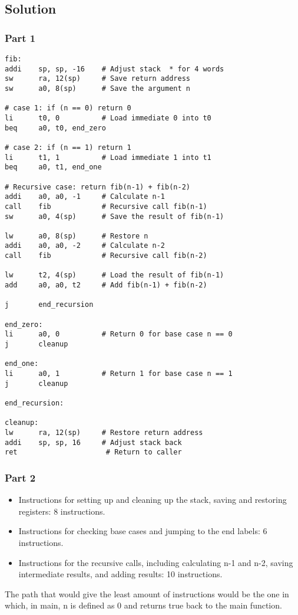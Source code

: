 \documentclass[11pt]{article}
\begin{document}
\subsection*{Solution}
\subsubsection*{Part 1}
\begin{lstlisting}
fib:
addi    sp, sp, -16    # Adjust stack  * for 4 words 
sw      ra, 12(sp)     # Save return address
sw      a0, 8(sp)      # Save the argument n

# case 1: if (n == 0) return 0
li      t0, 0          # Load immediate 0 into t0
beq     a0, t0, end_zero

# case 2: if (n == 1) return 1
li      t1, 1          # Load immediate 1 into t1
beq     a0, t1, end_one

# Recursive case: return fib(n-1) + fib(n-2)
addi    a0, a0, -1     # Calculate n-1
call    fib            # Recursive call fib(n-1)
sw      a0, 4(sp)      # Save the result of fib(n-1)

lw      a0, 8(sp)      # Restore n
addi    a0, a0, -2     # Calculate n-2
call    fib            # Recursive call fib(n-2)

lw      t2, 4(sp)      # Load the result of fib(n-1)
add     a0, a0, t2     # Add fib(n-1) + fib(n-2)

j       end_recursion

end_zero:
li      a0, 0          # Return 0 for base case n == 0
j       cleanup

end_one:
li      a0, 1          # Return 1 for base case n == 1
j       cleanup

end_recursion:

cleanup:
lw      ra, 12(sp)     # Restore return address
addi    sp, sp, 16     # Adjust stack back
ret                     # Return to caller
\end{lstlisting}
\subsubsection*{Part 2}
\begin{itemize}
\item Instructions for setting up and cleaning up the stack, saving and restoring registers: 8 instructions.
\item Instructions for checking base cases and jumping to the end labels: 6 instructions.
\item Instructions for the recursive calls, including calculating n-1 and n-2, saving intermediate results, and adding results: 10 instructions.
\end{itemize}
The path that would give the least amount of instructions would be the one in which, in main, n is defined as 0 and returns true back to the main function.
\end{document}
